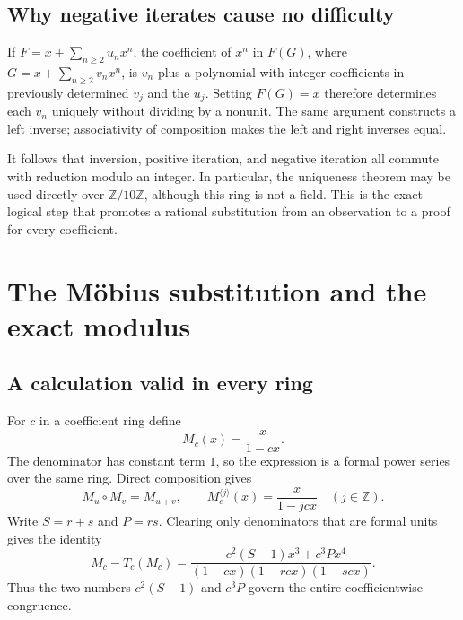 \documentclass[11pt,letterpaper]{article}
\theoremstyle{definition}
\theoremstyle{remark}
\newcommand{\Z}{\mathbb Z}
\newcommand{\iter}[2]{#1^{\langle #2\rangle}}
\begin{document}
\subsection{Why negative iterates cause no difficulty}
If $F=x+\sum_{n\geq2}u_nx^n$, the coefficient of $x^n$ in
$F(G)$, where $G=x+\sum_{n\geq2}v_nx^n$, is $v_n$ plus a polynomial
with integer coefficients in previously determined $v_j$ and the
$u_j$.  Setting $F(G)=x$ therefore determines each $v_n$ uniquely without
dividing by a nonunit.  The same argument constructs a left inverse;
associativity of composition makes the left and right inverses equal.

It follows that inversion, positive iteration, and negative iteration
all commute with reduction modulo an integer.  In particular, the
uniqueness theorem may be used directly over $\Z/10\Z$, although this
ring is not a field.  This is the exact logical step that promotes a
rational substitution from an observation to a proof for every
coefficient.

\section{The M\"obius substitution and the exact modulus}\label{sec:modulus}

\subsection{A calculation valid in every ring}
For $c$ in a coefficient ring define
\[
 M_c(x)=\frac{x}{1-cx}.
\]
The denominator has constant term $1$, so the expression is a formal
power series over the same ring.  Direct composition gives
\begin{equation}\label{eq:mobiusgroup}
 M_u\circ M_v=M_{u+v},\qquad
 \iter{M_c}{j}(x)=\frac{x}{1-jcx}\quad(j\in\Z).
\end{equation}
Write $S=r+s$ and $P=rs$.  Clearing only denominators that are formal
units gives the identity
\begin{equation}\label{eq:residual}
 M_c-T_c(M_c)
 =\frac{-c^2(S-1)x^3+c^3P x^4}
 {(1-cx)(1-rcx)(1-scx)}.
\end{equation}
Thus the two numbers $c^2(S-1)$ and $c^3P$ govern the entire
coefficientwise congruence.
\end{document}
